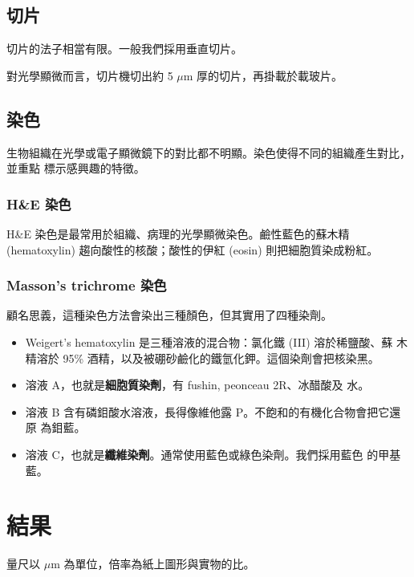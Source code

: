 \documentclass[a4paper,twocolumn]{article}
\begin{document}
\subsection{切片}
切片的法子相當有限。一般我們採用垂直切片。

對光學顯微而言，切片機切出約 5 $\mu$m 厚的切片，再掛載於載玻片。

\subsection{染色}
生物組織在光學或電子顯微鏡下的對比都不明顯。染色使得不同的組織產生對比，並重點
標示感興趣的特徵。

\subsubsection{H\&E 染色}
H\&E 染色是最常用於組織、病理的光學顯微染色。鹼性藍色的蘇木精
(hematoxylin) 趨向酸性的核酸；酸性的伊紅 (eosin) 則把細胞質染成粉紅。

\subsubsection{Masson's trichrome 染色}
顧名思義，這種染色方法會染出三種顏色，但其實用了四種染劑。
\begin{itemize}
    \item Weigert's hematoxylin 是三種溶液的混合物：氯化鐵 (III) 溶於稀鹽酸、蘇
        木精溶於 95\% 酒精，以及被硼砂鹼化的鐵氫化鉀。這個染劑會把核染黑。
    \item 溶液 A，也就是\textbf{細胞質染劑}，有 fushin, peonceau 2R、冰醋酸及
        水。
    \item 溶液 B 含有磷鉬酸水溶液，長得像維他露 P。不飽和的有機化合物會把它還原
        為鉬藍。
    \item 溶液 C，也就是\textbf{纖維染劑}。通常使用藍色或綠色染劑。我們採用藍色
        的甲基藍。
\end{itemize}

\section{結果}
量尺以 $\mu$m 為單位，倍率為紙上圖形與實物的比。
\end{document}
